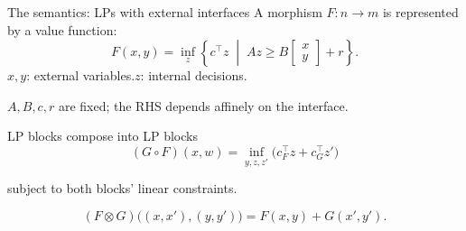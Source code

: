 \documentclass[aspectratio=169,12pt]{beamer}
\begin{document}
\begin{frame}[t]{The semantics: LPs with external interfaces}
{\small A morphism $F:n\to m$ is represented by a value function:}
\[
F(x,y)=
\inf_z\left\{c^\top z\;\middle|\;
Az\ge B\begin{bmatrix}x\\y\end{bmatrix}+r\right\}.
\]
\vspace{3mm}
{\small $x,y$: external variables.\qquad $z$: internal decisions.}\par
\vspace{3mm}
{\small $A,B,c,r$ are fixed; the RHS depends affinely on the interface.}
\end{frame}

\begin{frame}[t]{LP blocks compose into LP blocks}
\[
(G\circ F)(x,w)=\inf_{y,z,z'}
\bigl(c_F^\top z+c_G^\top z'\bigr)
\]
{\centering\small subject to both blocks' linear constraints.\par}
\vspace{2mm}
\[
(F\otimes G)\bigl((x,x'),(y,y')\bigr)
=F(x,y)+G(x',y').
\]
\end{frame}
\end{document}
